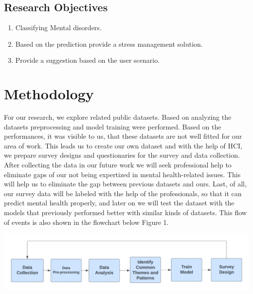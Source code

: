 \documentclass[a0,landscape]{a0poster}
\begin{document}
\begin{multicols}{4}
\subsection*{Research Objectives}
\begin{enumerate}
\itemsep-0.2em 

  \item Classifying Mental disorders.
  \item Based on the prediction provide a stress management solution.
  \item Provide a suggestion based on the user scenario.

            
\end{enumerate}


\color{DarkSlateGray} %





\section*{Methodology}

For our research, we explore related public datasets. Based on analyzing the datasets preprocessing and model training were performed. Based on the performances, it was visible to us, that these datasets are not well fitted for our area of work. This leads us to create our own dataset and with the help of HCI, we prepare survey designs and questionaries for the survey and data collection. After collecting the data in our future work we will seek professional help to eliminate gaps of our not being expertized in mental health-related issues. This will help us to eliminate the gap between previous datasets and ours. Last, of all, our survey data will be labeled with the help of the professionals, so that it can predict mental health properly, and later on we will test the dataset with the models that previously performed better with similar kinds of datasets. This flow of events is also shown in the flowchart below Figure 1.
 


\begin{center}
\begin{minipage}[t]{1\linewidth}
\includegraphics[width=\linewidth]{figures/Workflow_1.png} %
\end{minipage}


\end{center}
\end{multicols}
\end{document}
